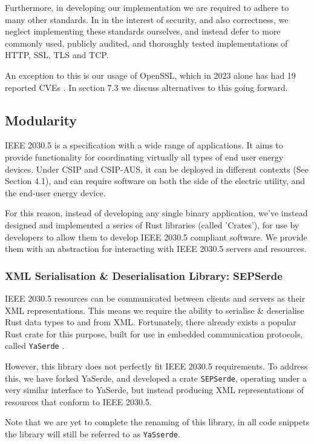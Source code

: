 Furthermore, in developing our implementation we are required to adhere to many other standards. In in the interest of security, and also correctness, we neglect implementing these standards ourselves, and instead defer to more commonly used, publicly audited, and thoroughly tested implementations of HTTP, SSL, TLS and TCP. 

An exception to this is our usage of OpenSSL, which in 2023 alone has had 19 reported CVEs \cite{OpensslCVE}. In section 7.3 we discuss alternatives to this going forward.

\subsection{Modularity}
IEEE 2030.5 is a specification with a wide range of applications. It aims to provide functionality for coordinating virtually all types of end user energy devices. Under CSIP and CSIP-AUS, it can be deployed in different contexts (See Section 4.1), and can require software on both the side of the electric utility, and the end-user energy device.

For this reason, instead of developing any single binary application, we've instead designed and implemented a series of Rust libraries (called 'Crates'), for use by developers to allow them to develop IEEE 2030.5 compliant software. We provide them with an abstraction for interacting with IEEE 2030.5 servers and resources.

\subsubsection{XML Serialisation \& Deserialisation Library: \- SEPSerde}
IEEE 2030.5 resources can be communicated between clients and servers as their XML representations. This means we require the ability to serialise \& deserialise Rust data types to and from XML.
Fortunately, there already exists a popular Rust crate for this purpose, built for use in embedded communication protocols, called \texttt{YaSerde} \cite[]{YaSerde}.

However, this library does not perfectly fit IEEE 2030.5 requirements. To address this, we have forked YaSerde, and developed a crate \texttt{SEPSerde}, operating under a very similar interface to YaSerde, but instead producing XML representations of resources that conform to IEEE 2030.5.

Note that we are yet to complete the renaming of this library, in all code snippets the library will still be referred to as \texttt{YaSserde}.

